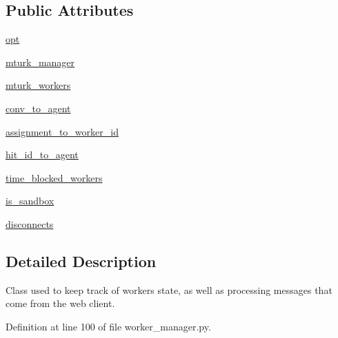 \subsection*{Public Attributes}
\begin{DoxyCompactItemize}
\item 
\hyperlink{classparlai_1_1mturk_1_1core_1_1legacy__2018_1_1worker__manager_1_1WorkerManager_a5ded59b0eaf47582110862cc1b8b379e}{opt}
\item 
\hyperlink{classparlai_1_1mturk_1_1core_1_1legacy__2018_1_1worker__manager_1_1WorkerManager_a12d2994adc934a5e06f73c89db795b31}{mturk\+\_\+manager}
\item 
\hyperlink{classparlai_1_1mturk_1_1core_1_1legacy__2018_1_1worker__manager_1_1WorkerManager_a6cb32a6cb5daeecb553a8514ea4e4617}{mturk\+\_\+workers}
\item 
\hyperlink{classparlai_1_1mturk_1_1core_1_1legacy__2018_1_1worker__manager_1_1WorkerManager_aba0415d2901a20387861d02da72b5893}{conv\+\_\+to\+\_\+agent}
\item 
\hyperlink{classparlai_1_1mturk_1_1core_1_1legacy__2018_1_1worker__manager_1_1WorkerManager_aed0adcac2d4346a8547c3a536fd0af25}{assignment\+\_\+to\+\_\+worker\+\_\+id}
\item 
\hyperlink{classparlai_1_1mturk_1_1core_1_1legacy__2018_1_1worker__manager_1_1WorkerManager_aa180307b749db9ce504b0a510847a6c5}{hit\+\_\+id\+\_\+to\+\_\+agent}
\item 
\hyperlink{classparlai_1_1mturk_1_1core_1_1legacy__2018_1_1worker__manager_1_1WorkerManager_a0bb97581f917b4dddca801e68fa5dfb3}{time\+\_\+blocked\+\_\+workers}
\item 
\hyperlink{classparlai_1_1mturk_1_1core_1_1legacy__2018_1_1worker__manager_1_1WorkerManager_a63765df2448a589f07525292d44489a7}{is\+\_\+sandbox}
\item 
\hyperlink{classparlai_1_1mturk_1_1core_1_1legacy__2018_1_1worker__manager_1_1WorkerManager_a69101bd8ac735ee1c42a1778eeb8e812}{disconnects}
\end{DoxyCompactItemize}


\subsection{Detailed Description}
\begin{DoxyVerb}Class used to keep track of workers state, as well as processing messages that come
from the web client.
\end{DoxyVerb}
 

Definition at line 100 of file worker\+\_\+manager.\+py.



